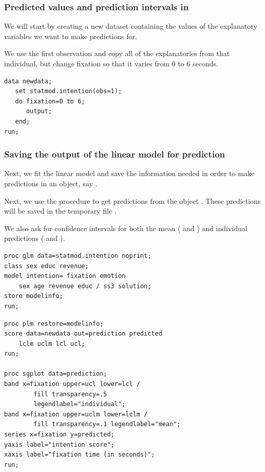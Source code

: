 \documentclass{beamer}
\begin{document}
\begin{frame}[fragile]
\frametitle{Predicted values and prediction intervals in \SASlang}
\bi
\item We will start by creating a new dataset  containing the values of the explanatory variables we want to make predictions for. 
\item We use the first observation and copy all of the explanatories from that individual, but change fixation so that it varies from $0$ to $6$ seconds.
\ei
\begin{tcolorbox}[colback=white, colframe=hecblue, title=\SASlang code to create a new dataset \code{newdata} ]
\begin{verbatim}
data newdata;
   set statmod.intention(obs=1);
   do fixation=0 to 6;
      output;
   end;
run;
\end{verbatim}
\end{tcolorbox}
\end{frame}

\begin{frame}[fragile]
\frametitle{Saving the output of the linear model for prediction}
\bi
\item Next, we fit the linear model and save the information needed in order to make predictions in an object, say .
\item Next, we use the procedure  to get predictions from the object . These predictions will be saved in the temporary file .
\item We also ask for confidence intervals for both the mean ( and ) and individual predictions ( and ).
\ei
\begin{tcolorbox}[colback=white, colframe=hecblue, title=\SASlang code to save fit of linear models]
{\small
\begin{verbatim}
proc glm data=statmod.intention noprint;
class sex educ revenue;
model intention= fixation emotion 
    sex age revenue educ / ss3 solution;
store modelinfo; 
run;
\end{verbatim}
}
\end{tcolorbox}
\end{frame}

\begin{frame}[fragile]

\begin{tcolorbox}[colback=white, colframe=hecblue, title=\SASlang code to get predictions using \code{plm} ]
\begin{verbatim}
proc plm restore=modelinfo; 
score data=newdata out=prediction predicted 
    lclm uclm lcl ucl; 
run;

proc sgplot data=prediction;
band x=fixation upper=ucl lower=lcl / 
        fill transparency=.5 
        legendlabel="individual";
band x=fixation upper=uclm lower=lclm / 
        fill transparency=.1 legendlabel="mean";
series x=fixation y=predicted;
yaxis label="intention score";
xaxis label="fixation time (in seconds)";
run;
\end{verbatim}
\end{tcolorbox}
\end{frame}
\end{document}
